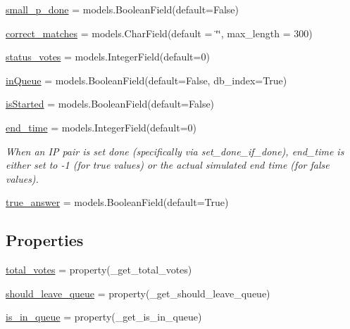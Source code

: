 \begin{DoxyCompactItemize}
\item 
\hyperlink{classdynamicfilterapp_1_1models_1_1_i_p___pair_a1010f48fff23c463d3e3da94d9542d02}{small\+\_\+p\+\_\+done} = models.\+Boolean\+Field(default=False)
\item 
\hyperlink{classdynamicfilterapp_1_1models_1_1_i_p___pair_afa7f671131faeb023ff23ff8593cc029}{correct\+\_\+matches} = models.\+Char\+Field(default = \char`\"{}\char`\"{}, max\+\_\+length = 300)
\item 
\hyperlink{classdynamicfilterapp_1_1models_1_1_i_p___pair_a1127c5a8b4c39b02ba8d32d45f1881c3}{status\+\_\+votes} = models.\+Integer\+Field(default=0)
\item 
\hyperlink{classdynamicfilterapp_1_1models_1_1_i_p___pair_af5ba33bf8fddcc8f610ee2d0091ded53}{in\+Queue} = models.\+Boolean\+Field(default=False, db\+\_\+index=True)
\item 
\hyperlink{classdynamicfilterapp_1_1models_1_1_i_p___pair_a4dfad4da8b9c480e78a3ad161ce723f1}{is\+Started} = models.\+Boolean\+Field(default=False)
\item 
\hyperlink{classdynamicfilterapp_1_1models_1_1_i_p___pair_aa18736cc12f8beb112bd108c5a09ef8d}{end\+\_\+time} = models.\+Integer\+Field(default=0)
\begin{DoxyCompactList}\small\item\em When an IP pair is set done (specifically via set\+\_\+done\+\_\+if\+\_\+done), end\+\_\+time is either set to -\/1 (for true values) or the actual simulated end time (for false values). \end{DoxyCompactList}\item 
\hyperlink{classdynamicfilterapp_1_1models_1_1_i_p___pair_ab1306c9f450db4ef7220faa3842affa7}{true\+\_\+answer} = models.\+Boolean\+Field(default=True)
\end{DoxyCompactItemize}
\subsection*{Properties}
\begin{DoxyCompactItemize}
\item 
\hyperlink{classdynamicfilterapp_1_1models_1_1_i_p___pair_a6de192eaff22c17d7eba33f9846d5cc3}{total\+\_\+votes} = property(\+\_\+get\+\_\+total\+\_\+votes)
\item 
\hyperlink{classdynamicfilterapp_1_1models_1_1_i_p___pair_a63cbe78a2b2e4520b738f01642954f9c}{should\+\_\+leave\+\_\+queue} = property(\+\_\+get\+\_\+should\+\_\+leave\+\_\+queue)
\item 
\hyperlink{classdynamicfilterapp_1_1models_1_1_i_p___pair_aa3c0cb873f3a4737bc2c357226618928}{is\+\_\+in\+\_\+queue} = property(\+\_\+get\+\_\+is\+\_\+in\+\_\+queue)
\end{DoxyCompactItemize}



